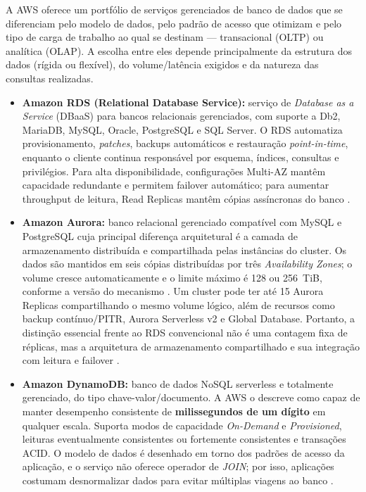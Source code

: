 \documentclass[11pt,a4paper]{article}
\begin{document}
A AWS oferece um portfólio de serviços gerenciados de banco de dados que se diferenciam pelo modelo de dados, pelo padrão de acesso que otimizam e pelo tipo de carga de trabalho ao qual se destinam --- transacional (OLTP) ou analítica (OLAP). A escolha entre eles depende principalmente da estrutura dos dados (rígida ou flexível), do volume/latência exigidos e da natureza das consultas realizadas.

\begin{itemize}[leftmargin=*]

    \item \textbf{Amazon RDS (Relational Database Service):} serviço de \emph{Database as a Service} (DBaaS) para bancos relacionais gerenciados, com suporte a Db2, MariaDB, MySQL, Oracle, PostgreSQL e SQL Server. O RDS automatiza provisionamento, \emph{patches}, backups automáticos e restauração \emph{point-in-time}, enquanto o cliente continua responsável por esquema, índices, consultas e privilégios. Para alta disponibilidade, configurações Multi-AZ mantêm capacidade redundante e permitem failover automático; para aumentar throughput de leitura, Read Replicas mantêm cópias assíncronas do banco \cite{rdsmultiaz}\cite{rdsreadreplicas}.

    \item \textbf{Amazon Aurora:} banco relacional gerenciado compatível com MySQL e PostgreSQL cuja principal diferença arquitetural é a camada de armazenamento distribuída e compartilhada pelas instâncias do cluster. Os dados são mantidos em seis cópias distribuídas por três \emph{Availability Zones}; o volume cresce automaticamente e o limite máximo é 128 ou 256~TiB, conforme a versão do mecanismo \cite{auroralimits}. Um cluster pode ter até 15 Aurora Replicas compartilhando o mesmo volume lógico, além de recursos como backup contínuo/PITR, Aurora Serverless v2 e Global Database. Portanto, a distinção essencial frente ao RDS convencional não é uma contagem fixa de réplicas, mas a arquitetura de armazenamento compartilhado e sua integração com leitura e failover \cite{aurorafaq}.

    \item \textbf{Amazon DynamoDB:} banco de dados NoSQL serverless e totalmente gerenciado, do tipo chave-valor/documento. A AWS o descreve como capaz de manter desempenho consistente de \textbf{milissegundos de um dígito} em qualquer escala. Suporta modos de capacidade \emph{On-Demand} e \emph{Provisioned}, leituras eventualmente consistentes ou fortemente consistentes e transações ACID. O modelo de dados é desenhado em torno dos padrões de acesso da aplicação, e o serviço não oferece operador de \emph{JOIN}; por isso, aplicações costumam desnormalizar dados para evitar múltiplas viagens ao banco \cite{dynamodb}.


\end{itemize}
\end{document}
